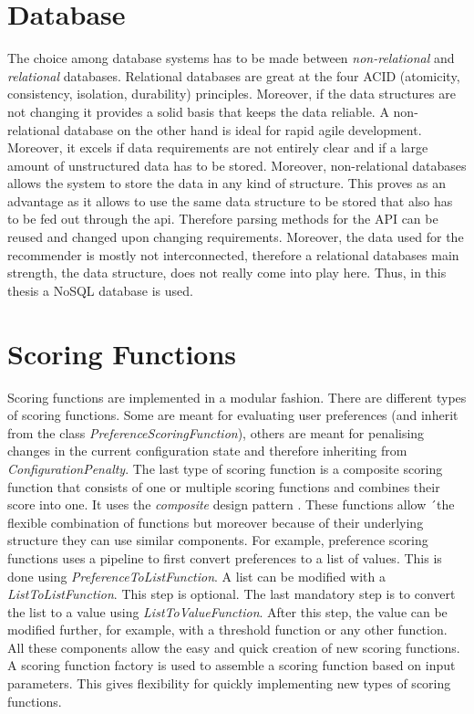 \section{Database}
\label{sec:DesignImplementation:Database}

The choice among database systems has to be made between \emph{non-relational} and \emph{relational} databases. Relational databases are great at the four ACID (atomicity, consistency, isolation, durability) principles. Moreover, if the data structures are not changing it provides a solid basis that keeps the data reliable. A non-relational database on the other hand is ideal for rapid agile development. Moreover, it excels if data requirements are not entirely clear and if a large amount of unstructured  data has to be stored. Moreover, non-relational databases allows the system to store the data in any kind of structure. This proves as an advantage as it allows to use the same data structure to be stored that also has to be fed out through the api. Therefore parsing methods for the API can be reused and changed upon changing requirements. Moreover, the data used for the recommender is mostly not interconnected, therefore a relational databases main strength, the data structure, does not really come into play here. Thus, in this thesis a NoSQL database is used. 

\section{Scoring Functions}
\label{sec:DesignImplementation:ScroingFunctions}

Scoring functions are implemented in a modular fashion. There are different types of scoring functions. Some are meant for evaluating user preferences (and inherit from the class \emph{PreferenceScoringFunction}), others are meant for penalising changes in the current configuration state and therefore inheriting from  \emph{ConfigurationPenalty}. The last type of scoring function is a composite scoring function that consists of one or multiple scoring functions and combines their score into one. It uses the \emph{composite} design pattern . These functions allow ´the flexible combination of functions but moreover because of their underlying structure they can use similar components. For example, preference scoring functions uses a pipeline to first convert preferences to a list of values. This is done using \emph{PreferenceToListFunction}. A list can be modified with a \emph{ListToListFunction}. This step is optional. The last mandatory step is to convert the list to a value using \emph{ListToValueFunction}. After this step, the value can be modified further, for example, with a threshold function or any other function. All these components allow the easy and quick creation of new scoring functions. A scoring function factory is used to assemble a scoring function based on input parameters. This gives flexibility for quickly implementing new types of scoring functions.



